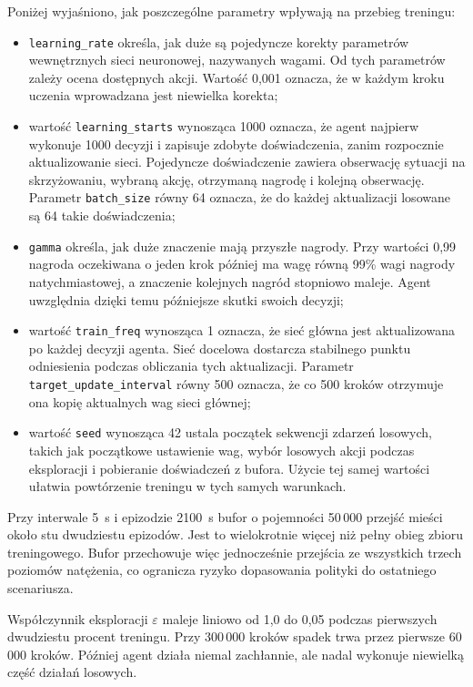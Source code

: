 Poniżej wyjaśniono, jak poszczególne parametry wpływają na przebieg treningu:
{\setlength{\emergencystretch}{1em}
\begin{itemize}
    \item \texttt{learning\_rate} określa, jak duże są pojedyncze korekty parametrów wewnętrznych sieci neuronowej, nazywanych wagami. Od tych parametrów zależy ocena dostępnych akcji. Wartość 0,001 oznacza, że w każdym kroku uczenia wprowadzana jest niewielka korekta;
    \item wartość \texttt{learning\_starts} wynosząca 1000 oznacza, że agent najpierw wykonuje 1000 decyzji i zapisuje zdobyte doświadczenia, zanim rozpocznie aktualizowanie sieci. Pojedyncze doświadczenie zawiera obserwację sytuacji na skrzyżowaniu, wybraną akcję, otrzymaną nagrodę i kolejną obserwację. Parametr \texttt{batch\_size} równy 64 oznacza, że do każdej aktualizacji losowane są 64 takie doświadczenia;
    \item \texttt{gamma} określa, jak duże znaczenie mają przyszłe nagrody. Przy wartości 0,99 nagroda oczekiwana o jeden krok później ma wagę równą 99\% wagi nagrody natychmiastowej, a znaczenie kolejnych nagród stopniowo maleje. Agent uwzględnia dzięki temu późniejsze skutki swoich decyzji;
    \item wartość \texttt{train\_freq} wynosząca 1 oznacza, że sieć główna jest aktualizowana po każdej decyzji agenta. Sieć docelowa dostarcza stabilnego punktu odniesienia podczas obliczania tych aktualizacji. Parametr \texttt{target\_update\_interval} równy 500 oznacza, że co 500 kroków otrzymuje ona kopię aktualnych wag sieci głównej;
    \item wartość \texttt{seed} wynosząca 42 ustala początek sekwencji zdarzeń losowych, takich jak początkowe ustawienie wag, wybór losowych akcji podczas eksploracji i pobieranie doświadczeń z bufora. Użycie tej samej wartości ułatwia powtórzenie treningu w tych samych warunkach.
\end{itemize}
}

Przy interwale 5~s i epizodzie 2100~s bufor o pojemności 50\,000 przejść mieści około stu dwudziestu epizodów. Jest to wielokrotnie więcej niż pełny obieg zbioru treningowego. Bufor przechowuje więc jednocześnie przejścia ze wszystkich trzech poziomów natężenia, co ogranicza ryzyko dopasowania polityki do ostatniego scenariusza.

Współczynnik eksploracji $\varepsilon$ maleje liniowo od 1,0 do 0,05 podczas pierwszych dwudziestu procent treningu. Przy 300\,000 kroków spadek trwa przez pierwsze 60\,000 kroków. Później agent działa niemal zachłannie, ale nadal wykonuje niewielką część działań losowych.

